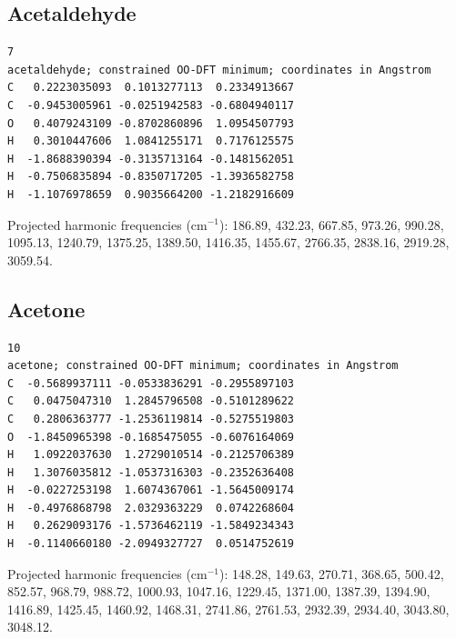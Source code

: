 \par\noindent\begin{minipage}{\linewidth}
\subsection{Acetaldehyde}
\begin{verbatim}
7
acetaldehyde; constrained OO-DFT minimum; coordinates in Angstrom
C   0.2223035093  0.1013277113  0.2334913667
C  -0.9453005961 -0.0251942583 -0.6804940117
O   0.4079243109 -0.8702860896  1.0954507793
H   0.3010447606  1.0841255171  0.7176125575
H  -1.8688390394 -0.3135713164 -0.1481562051
H  -0.7506835894 -0.8350717205 -1.3936582758
H  -1.1076978659  0.9035664200 -1.2182916609
\end{verbatim}
Projected harmonic frequencies (cm$^{-1}$): 186.89, 432.23, 667.85, 973.26, 990.28, 1095.13, 1240.79, 1375.25, 1389.50, 1416.35, 1455.67, 2766.35, 2838.16, 2919.28, 3059.54.

\end{minipage}\par\medskip
\par\noindent\begin{minipage}{\linewidth}
\subsection{Acetone}
\begin{verbatim}
10
acetone; constrained OO-DFT minimum; coordinates in Angstrom
C  -0.5689937111 -0.0533836291 -0.2955897103
C   0.0475047310  1.2845796508 -0.5101289622
C   0.2806363777 -1.2536119814 -0.5275519803
O  -1.8450965398 -0.1685475055 -0.6076164069
H   1.0922037630  1.2729010514 -0.2125706389
H   1.3076035812 -1.0537316303 -0.2352636408
H  -0.0227253198  1.6074367061 -1.5645009174
H  -0.4976868798  2.0329363229  0.0742268604
H   0.2629093176 -1.5736462119 -1.5849234343
H  -0.1140660180 -2.0949327727  0.0514752619
\end{verbatim}
Projected harmonic frequencies (cm$^{-1}$): 148.28, 149.63, 270.71, 368.65, 500.42, 852.57, 968.79, 988.72, 1000.93, 1047.16, 1229.45, 1371.00, 1387.39, 1394.90, 1416.89, 1425.45, 1460.92, 1468.31, 2741.86, 2761.53, 2932.39, 2934.40, 3043.80, 3048.12.

\end{minipage}\par\medskip
